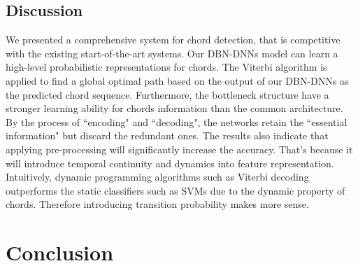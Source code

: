 \documentclass{article}
\begin{document}
\subsection{Discussion}
We presented a comprehensive system for chord detection, that is competitive with the existing start-of-the-art systems. Our DBN-DNNs model can learn a high-level probabilistic representations for chords. The Viterbi algorithm is applied to find a global optimal path based on the output of our DBN-DNNs as the predicted chord sequence. Furthermore, the bottleneck structure have a stronger learning ability for chords information than the common architecture. By the process of ``encoding" and ``decoding", the networks retain the ``essential information" but discard the redundant ones. The results also indicate that applying pre-processing will significantly increase the accuracy. That's because it will introduce temporal continuity and dynamics into feature representation. Intuitively, dynamic programming algorithms such as Viterbi decoding outperforms the static classifiers such as SVMs due to the dynamic property of chords. Therefore introducing transition probability makes more sense. 

\section{Conclusion}



\end{document}
